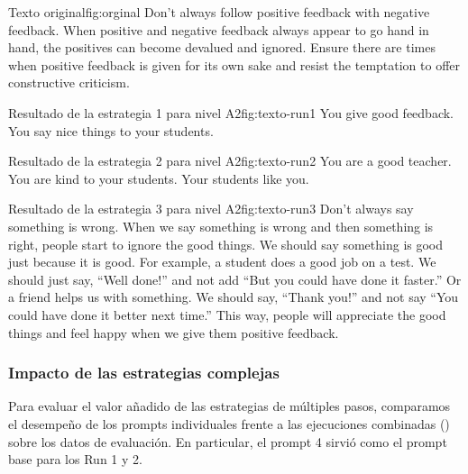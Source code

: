 \begin{textexample}{}{Texto original}{fig:orginal}
Don't always follow positive feedback with negative feedback. When positive and negative feedback always appear to go hand in hand, the positives can become devalued and ignored. Ensure there are times when positive feedback is given for its own sake and resist the temptation to offer constructive criticism.
\end{textexample}


\begin{textexample}{}{Resultado de la estrategia 1 para nivel A2}{fig:texto-run1}
You give good feedback. You say nice things to your students.
\end{textexample}

\begin{textexample}{}{Resultado de la estrategia 2 para nivel A2}{fig:texto-run2}
You are a good teacher. You are kind to your students. Your students like you.
\end{textexample}

\begin{textexample}{}{Resultado de la estrategia 3 para nivel A2}{fig:texto-run3}
Don't always say something is wrong. When we say something is wrong and then something is right, people start to ignore the good things. We should say something is good just because it is good.
For example, a student does a good job on a test. We should just say, ``Well done!'' and not add ``But you could have done it faster.'' Or a friend helps us with something. We should say, ``Thank you!'' and not say ``You could have done it better next time.''\newline
This way, people will appreciate the good things and feel happy when we give them positive feedback.
\end{textexample}


\subsubsection*{Impacto de las estrategias complejas}
Para evaluar el valor añadido de las estrategias de múltiples pasos, comparamos el desempeño de los prompts individuales frente a las ejecuciones combinadas () sobre los datos de evaluación. En particular, el prompt 4 sirvió como el prompt base para los Run 1 y 2.

